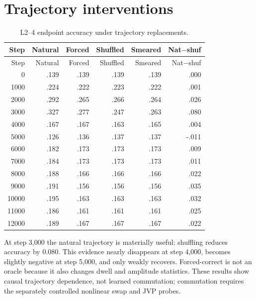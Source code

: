 \documentclass[10pt]{article}
\begin{document}
\section{Trajectory interventions}
\begin{longtable}{rrrrrr}
\caption{L2--4 endpoint accuracy under trajectory replacements.}\\
\toprule Step&Natural&Forced&Shuffled&Smeared&Nat$-$shuf\\\midrule\endfirsthead
\toprule Step&Natural&Forced&Shuffled&Smeared&Nat$-$shuf\\\midrule\endhead
0&.139&.139&.139&.139&.000\\1000&.224&.222&.223&.222&.001\\
2000&.292&.265&.266&.264&.026\\3000&.327&.277&.247&.263&.080\\
4000&.167&.167&.163&.165&.004\\5000&.126&.136&.137&.137&-.011\\
6000&.182&.173&.173&.173&.009\\7000&.184&.173&.173&.173&.011\\
8000&.188&.166&.166&.166&.022\\9000&.191&.156&.156&.156&.035\\
10000&.195&.163&.163&.163&.032\\11000&.186&.161&.161&.161&.025\\
12000&.189&.167&.167&.167&.022\\\bottomrule
\end{longtable}

At step 3,000 the natural trajectory is materially useful: shuffling reduces
accuracy by 0.080. This evidence nearly disappears at step 4,000, becomes
slightly negative at step 5,000, and only weakly recovers. Forced-correct is
not an oracle because it also changes dwell and amplitude statistics. These
results show causal trajectory dependence, not learned commutation; commutation
requires the separately controlled nonlinear swap and JVP probes.
\end{document}
